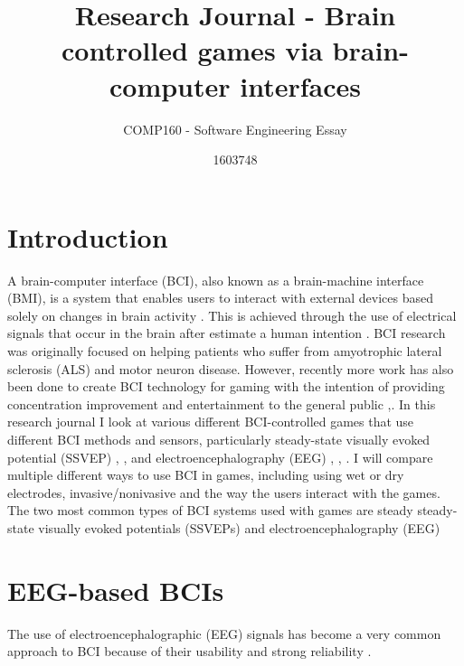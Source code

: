 \documentclass{scrartcl}
\title{Research Journal - Brain controlled games via brain-computer interfaces}
\subtitle{COMP160 - Software Engineering Essay}
\author{1603748}
\begin{document}
\maketitle


\section*{Introduction}
A brain-computer interface (BCI), also known as a brain-machine interface (BMI), is a system that enables users to interact with external devices based solely on changes in brain activity \cite{Checkers}. This is achieved through the use of electrical signals that occur in the brain after estimate a human intention \cite{SharedRacing}. BCI research was originally focused on helping patients who suffer from amyotrophic
lateral sclerosis (ALS) and motor neuron disease. However, recently more work has also been done to create BCI technology for gaming with the intention of providing concentration improvement and entertainment to the general public \cite{SharedRacing},\cite{Spacecraft}. In this research journal I look at various different BCI-controlled games that use different BCI methods and sensors, particularly steady-state visually evoked potential (SSVEP) \cite{Checkers}, \cite{GamingSystem}, \cite{Spacecraft} and electroencephalography (EEG) \cite{GamingControlling}, \cite{SharedRacing}, \cite{AndroidRacing} . I will compare multiple different ways to use BCI in games, including using wet or dry electrodes, invasive/nonivasive and the way the users interact with the games. The two most common types of BCI systems used with games are steady steady-state visually evoked potentials (SSVEPs) and electroencephalography (EEG)

\section*{EEG-based BCIs}
The use of electroencephalographic (EEG) signals has become a very common approach to BCI because of their usability and strong reliability \cite{GamingControlling}.
\end{document}
